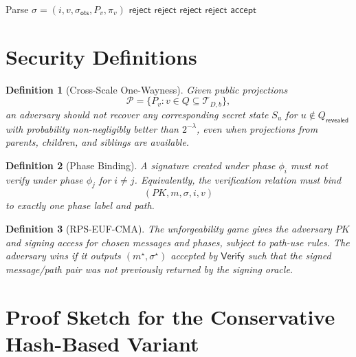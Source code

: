 \documentclass[11pt]{article}
\newtheorem{definition}{Definition}
\begin{document}
\begin{algorithm}
\caption{$\mathsf{Verify}(PK,m,\sigma)$}
\begin{algorithmic}[1]
\State Parse $\sigma=(i,v,\sigma_{\mathsf{ots}},P_v,\pi_v)$
 \State \Return $\mathsf{reject}$ \EndIf
{}
  \State \Return $\mathsf{reject}$
\EndIf
{}
  \State \Return $\mathsf{reject}$
\EndIf
{}
  \State \Return $\mathsf{reject}$
\EndIf
\State \Return $\mathsf{accept}$
\end{algorithmic}
\end{algorithm}

\section{Security Definitions}

\begin{definition}[Cross-Scale One-Wayness]
Given public projections
\[
  \mathcal{P}=\{P_v : v \in Q \subseteq \mathcal{T}_{D,b}\},
\]
an adversary should not recover any corresponding secret state $S_u$ for
$u\notin Q_{\mathsf{revealed}}$ with probability non-negligibly better than
$2^{-\lambda}$, even when projections from parents, children, and siblings are
available.
\end{definition}

\begin{definition}[Phase Binding]
A signature created under phase $\phi_i$ must not verify under phase $\phi_j$
for $i\neq j$. Equivalently, the verification relation must bind
\[
  (PK,m,\sigma,i,v)
\]
to exactly one phase label and path.
\end{definition}

\begin{definition}[RPS-EUF-CMA]
The unforgeability game gives the adversary $PK$ and signing access for chosen
messages and phases, subject to path-use rules. The adversary wins if it outputs
$(m^\star,\sigma^\star)$ accepted by $\mathsf{Verify}$ such that the signed
message/path pair was not previously returned by the signing oracle.
\end{definition}

\section{Proof Sketch for the Conservative Hash-Based Variant}
\end{document}
